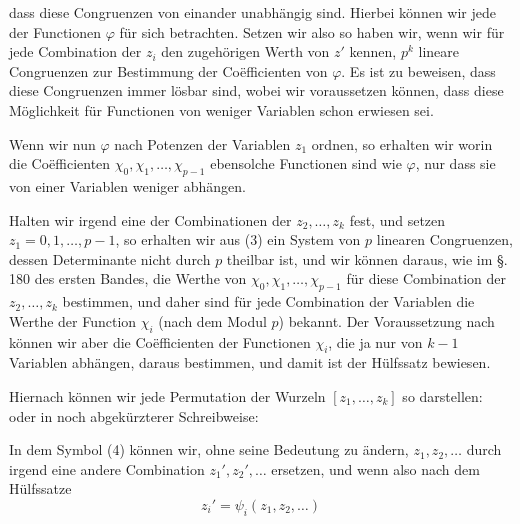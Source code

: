 dass diese Congruenzen von einander unabh\"angig sind. Hierbei k\"onnen wir jede der Functionen $\varphi$ f\"ur sich betrachten. Setzen wir also
so haben wir, wenn wir f\"ur jede Combination der $z_i$ den zugeh\"origen Werth von $z'$ kennen, $p^k$ lineare Congruenzen zur Bestimmung der Co\"efficienten von $\varphi$. Es ist zu beweisen, dass diese Congruenzen immer l\"osbar sind, wobei wir voraussetzen k\"onnen, dass diese M\"oglichkeit f\"ur Functionen von weniger Variablen schon erwiesen sei.

Wenn wir nun $\varphi$ nach Potenzen der Variablen $z_1$ ordnen, so erhalten wir
worin die Co\"efficienten $\chi_0, \chi_1, \ldots, \chi_{p-1}$ ebensolche Functionen sind wie $\varphi$, nur dass sie von einer Variablen weniger abh\"angen.

Halten wir irgend eine der Combinationen der $z_2, \ldots, z_k$ fest, und setzen $z_1 = 0, 1, \ldots, p - 1$, so erhalten wir aus (3) ein System von $p$ linearen Congruenzen, dessen Determinante nicht durch $p$ theilbar ist, und wir k\"onnen daraus, wie im \S.\,180 des ersten Bandes, die Werthe von $\chi_0, \chi_1, \ldots, \chi_{p-1}$ f\"ur diese Combination der $z_2, \ldots, z_k$ bestimmen, und daher sind f\"ur jede Combination der Variablen die Werthe der Function $\chi_i$ (nach dem Modul $p$) bekannt. Der Voraussetzung nach k\"onnen wir aber die Co\"efficienten der Functionen $\chi_i$, die ja nur von $k - 1$ Variablen abh\"angen, daraus bestimmen, und damit ist der H\"ulfssatz bewiesen.

Hiernach k\"onnen wir jede Permutation der Wurzeln $[z_1, \ldots, z_k]$ so darstellen:
oder in noch abgek\"urzterer Schreibweise:

In dem Symbol (4) k\"onnen wir, ohne seine Bedeutung zu \"andern, $z_1, z_2, \ldots$ durch irgend eine andere Combination $z_1', z_2', \ldots$ ersetzen, und wenn also nach dem H\"ulfssatze
\[
z_i' = \psi_i(z_1, z_2, \ldots)
\]
